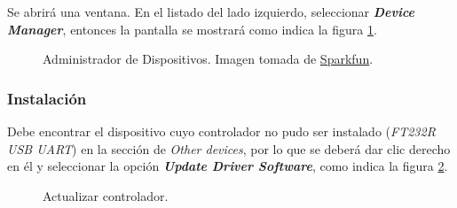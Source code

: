 Se abrirá una ventana. En el listado del lado izquierdo, seleccionar \textit{\textbf{Device Manager}}, entonces la pantalla se mostrará como indica la figura \ref{fig:DevMan}.

\begin{figure}[H] %
\caption[Administrador de Dispositivos]{Administrador de Dispositivos. Imagen tomada de \href{https://learn.sparkfun.com/tutorials/how-to-install-ftdi-drivers/all}{Sparkfun}.\footnotemark}
\label{fig:DevMan}
\end{figure}


\subsubsection{Instalación}\label{subsubsec:loop}

Debe encontrar el dispositivo cuyo controlador no pudo ser instalado (\textit{FT232R USB UART}) en la sección de \textit{Other devices}, por lo que se deberá dar clic derecho en él y seleccionar la opción \textit{\textbf{Update Driver Software}}, como indica la figura \ref{fig:DevMan2}.\label{subsec:st}

\begin{figure}[H] %
\caption{Actualizar controlador.}
\label{fig:DevMan2}
\end{figure}

